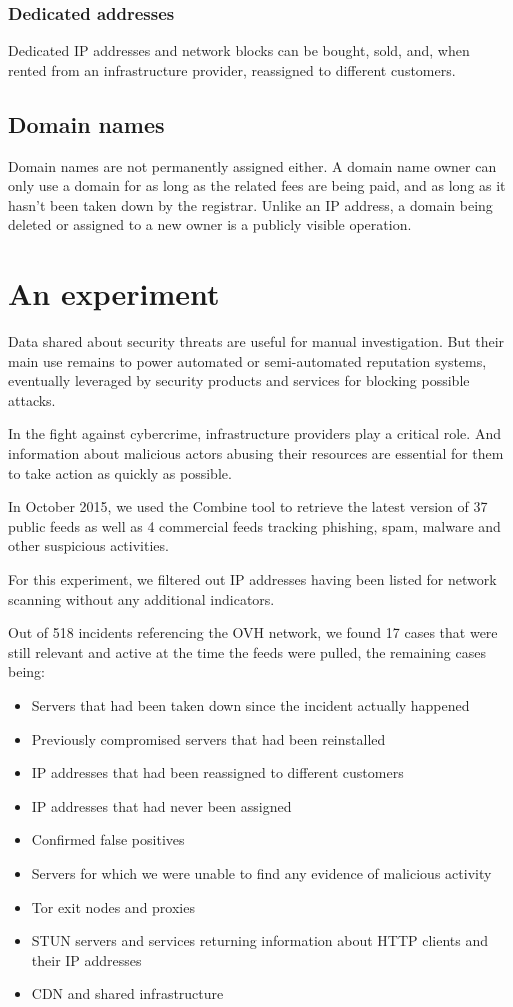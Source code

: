 \documentclass[conference]{IEEEtran}
\begin{document}
\subsubsection{Dedicated addresses}

Dedicated IP addresses and network blocks can be bought, sold, and, when rented from an infrastructure provider, reassigned to different customers.

\subsection{Domain names}

Domain names are not permanently assigned either. A domain name owner can only use a domain for as long as the related fees are being paid, and as long as it hasn't been taken down by the registrar. Unlike an IP address, a domain being deleted or assigned to a new owner is a publicly visible operation.

\section{An experiment}

Data shared about security threats are useful for manual investigation. But their main use remains to power automated or semi-automated reputation systems, eventually leveraged by security products and services for blocking possible attacks.

In the fight against cybercrime, infrastructure providers play a critical role. And information about malicious actors abusing their resources are essential for them to take action as quickly as possible.

In October 2015, we used the Combine \cite{combine} tool to retrieve the latest version of 37 public feeds as well as 4 commercial feeds tracking phishing, spam, malware and other suspicious activities.

For this experiment, we filtered out IP addresses having been listed for network scanning without any additional indicators.

Out of 518 incidents referencing the OVH network, we found 17 cases that were still relevant and active at the time the feeds were pulled, the remaining cases being:
\begin{itemize}
\item Servers that had been taken down since the incident actually happened
\item Previously compromised servers that had been reinstalled
\item IP addresses that had been reassigned to different customers
\item IP addresses that had never been assigned
\item Confirmed false positives
\item Servers for which we were unable to find any evidence of malicious activity
\item Tor exit nodes and proxies
\item STUN servers and services returning information about HTTP clients and their IP addresses
\item CDN and shared infrastructure
\end{itemize}
\end{document}
